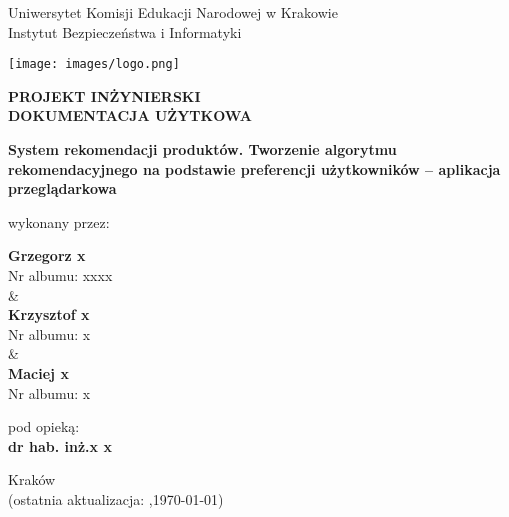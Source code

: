 \documentclass[12pt,a4paper,oneside]{article}
\theoremstyle{definition}
\numberwithin{equation}{section}
\begin{document}

\thispagestyle{empty} %
\begin{titlepage}
\begin{center}\Large
Uniwersytet Komisji Edukacji Narodowej w Krakowie\\
\large
Instytut Bezpieczeństwa i Informatyki\\
\vskip 10pt
\end{center}
\begin{center}
\centering \texttt{[image: images/logo.png]}
\end{center}

\begin{center}
 {\bf \fontsize{14pt}{14pt}\selectfont PROJEKT INŻYNIERSKI \\ DOKUMENTACJA UŻYTKOWA}
\end{center}
\vskip 5pt
\begin{center}
 {\bf \fontsize{15pt}{25pt}\selectfont System rekomendacji produktów. Tworzenie algorytmu rekomendacyjnego na
 podstawie preferencji użytkowników – aplikacja przeglądarkowa}
\end{center}

\begin{center}
 {\fontsize{12pt}{12pt}\selectfont wykonany przez: }
\end{center}
\begin{center}
 {\bf\fontsize{16pt}{16pt}\selectfont Grzegorz x}\\
 {\fontsize{12pt}{12pt}\selectfont Nr albumu:  xxxx \\\&\\}
 {\bf\fontsize{16pt}{16pt}\selectfont Krzysztof x }\\
 {\fontsize{12pt}{12pt}\selectfont Nr albumu: x \\\&\\}
 {\bf\fontsize{16pt}{16pt}\selectfont Maciej x }\\
 {\fontsize{12pt}{12pt}\selectfont Nr albumu: x}
\end{center}
\begin{center}
 {\fontsize{12pt}{12pt}\selectfont pod opieką:}\\
 {\bf\fontsize{12pt}{12pt}\selectfont dr hab. inż.x x  }
\end{center}

\vspace*{\fill}
\begin{center}
\large
Kraków \the\year\\
(ostatnia aktualizacja: \DTMcurrenttime,\;\today)
\end{center}
\end{titlepage}
\setcounter{page}{0} 
\newpage\null\thispagestyle{empty}
\end{document}
